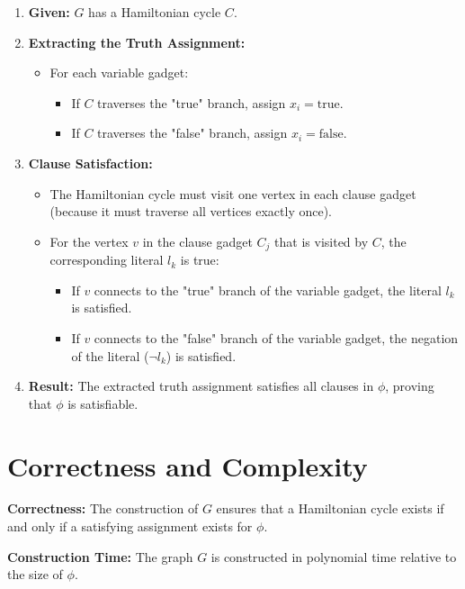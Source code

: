 \documentclass[10pt,letter,notitlepage]{article}
\begin{document}
\begin{Answer}
\begin{enumerate}
    \item \textbf{Given:} \(G\) has a Hamiltonian cycle \(C\).

    \item \textbf{Extracting the Truth Assignment:}
    \begin{itemize}
        \item For each variable gadget:
        \begin{itemize}
            \item If \(C\) traverses the "true" branch, assign \(x_i = \text{true}\).
            \item If \(C\) traverses the "false" branch, assign \(x_i = \text{false}\).
        \end{itemize}
    \end{itemize}

    \item \textbf{Clause Satisfaction:}
    \begin{itemize}
        \item The Hamiltonian cycle must visit one vertex in each clause gadget (because it must traverse all vertices exactly once).
        \item For the vertex \(v\) in the clause gadget \(C_j\) that is visited by \(C\), the corresponding literal \(l_k\) is true:
        \begin{itemize}
            \item If \(v\) connects to the "true" branch of the variable gadget, the literal \(l_k\) is satisfied.
            \item If \(v\) connects to the "false" branch of the variable gadget, the negation of the literal (\(\neg l_k\)) is satisfied.
        \end{itemize}
    \end{itemize}

    \item \textbf{Result:} The extracted truth assignment satisfies all clauses in \(\phi\), proving that \(\phi\) is satisfiable.
\end{enumerate}

\section*{Correctness and Complexity}

\textbf{Correctness:}
The construction of \(G\) ensures that a Hamiltonian cycle exists if and only if a satisfying assignment exists for \(\phi\).

\textbf{Construction Time:}
The graph \(G\) is constructed in polynomial time relative to the size of \(\phi\).


\end{Answer}
\end{document}
